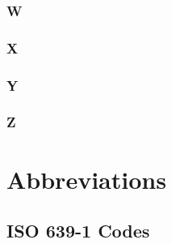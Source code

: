 \documentclass[12pt]{book}
\begin{document}
\begin{description}
\item[ ]
\end{description}

\subsection{W}

\begin{description}
\item[ ]
\end{description}

\subsection{X}

\begin{description}
\item[ ]
\end{description}

\subsection{Y}

\begin{description}
\item[ ]
\end{description}

\subsection{Z}

\begin{description}
\item[ ]
\end{description}






\chapter{Abbreviations}

\section{ISO 639-1 Codes}
\end{document}
